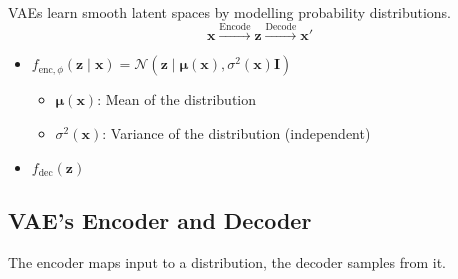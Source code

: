 \begin{definition}
    VAEs learn smooth latent spaces by modelling probability distributions.
    \[
    \mathbf{x} \xrightarrow{\text{Encode}} \mathbf{z} \xrightarrow{\text{Decode}} \mathbf{x}'
    \]
    \begin{itemize}
        \item $f_{\text{enc}, \phi}(\mathbf{z} \mid \mathbf{x}) = \mathcal{N}(\mathbf{z} \mid \boldsymbol{\mu}(\mathbf{x}), \sigma^2(\mathbf{x}) \mathbf{I})$
        \begin{itemize}
            \item $\boldsymbol{\mu}(\mathbf{x})$: Mean of the distribution
            \item $\sigma^2(\mathbf{x})$: Variance of the distribution (independent)
        \end{itemize}
        \item $f_{\text{dec}}(\mathbf{z})$
    \end{itemize}
\end{definition}

\subsection{VAE's Encoder and Decoder}
\begin{definition}
    The encoder maps input to a distribution, the decoder samples from it.
\end{definition}

